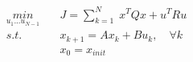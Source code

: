 \documentclass[preview]{standalone}
\begin{document}
\begin{align*}
\underset{u_1 ... u_{N-1}}{min}  \quad &J = \sum_{k=1}^N \; x^TQx + u^T R u \\ s.t. \quad &x_{k+1} = Ax_k + Bu_k, \quad \forall k \\ &x_0 = x_{init}
\end{align*}
\end{document}
